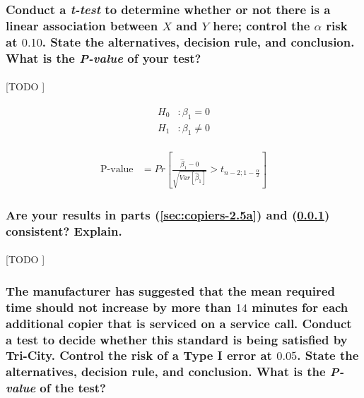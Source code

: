 \documentclass{article}
\begin{document}
      \subsubsection{Conduct a \emph{t-test} to determine whether or not there is a linear association between $X$ and $Y$ here; control the $\alpha$ risk at $0.10$. State the alternatives, decision rule, and conclusion. What is the \emph{P-value} of your test?}
      \label{sec:copiers-2.5b}

        \paragraph{}
        [TODO ]

        \begin{align}
          \begin{split}
            H_0&: \beta_1 = 0 \\
            H_1&: \beta_1 \neq 0
          \end{split}
        \end{align}

        \begin{align}
          \text{P-value} &= Pr\left[\frac{\widehat{\beta}_1 - 0}{\sqrt{Var\left[\widehat{\beta}_1\right]}} > t_{n-2;1-\frac{\alpha}{2}}\right]
        \end{align}

      \subsubsection{Are your results in parts (\ref{sec:copiers-2.5a}) and (\ref{sec:copiers-2.5b}) consistent? Explain.}

        \paragraph{}
        [TODO ]

      \subsubsection{The manufacturer has suggested that the mean required time should not increase by more
than $14$ minutes for each additional copier that is serviced on a service call. Conduct a test to decide whether this standard is being satisfied by Tri-City. Control the risk of a Type I error at $0.05$. State the alternatives, decision rule, and conclusion. What is the \emph{P-value} of the test?}
\end{document}
